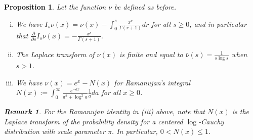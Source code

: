 \documentclass[10pt]{article}
\numberwithin{equation}{section}
\newtheorem{proposition}[theorem]{Proposition}
\theoremstyle{definition}
\newtheorem{remark}[theorem]{Remark}
\begin{document}
\begin{proposition} \label{PropEFunctForm}
Let  the function  $\nu$ be defined as before.
\begin{enumerate}[(i)]
    \item We have $ I_s\nu(x) = \nu(x)- \int_{0}^s\frac{ x^r}{\Gamma(r+1) }dr$ for all $s\geq 0$, and in particular that $
\frac{\partial}{\partial s} I_s\nu(x) =- \frac{x^{s}}{\Gamma(s+1) }   $.

   \item The Laplace transform of $\nu(x)$ is finite and equal to  $\bar{\nu}(s)=\frac{1}{s\log s}$ when $s>1$.



\item We have $\nu(x)=e^x-N(x)$ for  Ramanujan's integral $N(x):= \int_{0}^{\infty} \frac{e^{-ax} }{\pi^2+\log^2 a   }\frac{1}{a} da $ for all $x\geq 0$.


\end{enumerate}



\begin{remark}For the Ramanujan identity in (iii) above, note that $N(x) $ is the Laplace transform of the probability density for a centered $\log$-Cauchy distribution with scale parameter $\pi$.  In particular, $0<N(x)\leq 1$.
\end{remark}




\end{proposition}
\end{document}
